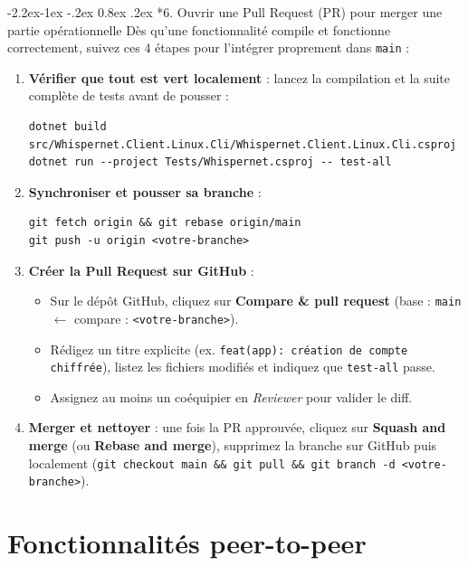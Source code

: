 \documentclass[11pt,a4paper]{article}
\makeatletter
\renewcommand\subsubsection{\@startsection{subsubsection}{3}{\z@}%
                                     {-2.2ex\@plus -1ex \@minus -.2ex}%
                                     {0.8ex \@plus .2ex}%
                                     {\normalfont\normalsize\bfseries\color{AccentTeal}}}
\makeatother
\begin{document}
\subsubsection*{6. Ouvrir une Pull Request (PR) pour merger une partie opérationnelle}
Dès qu'une fonctionnalité compile et fonctionne correctement, suivez ces 4 étapes pour l'intégrer proprement dans \texttt{main} :
\begin{enumerate}
    \item \textbf{Vérifier que tout est vert localement} : lancez la compilation et la suite complète de tests avant de pousser :
\begin{lstlisting}
dotnet build src/Whispernet.Client.Linux.Cli/Whispernet.Client.Linux.Cli.csproj
dotnet run --project Tests/Whispernet.csproj -- test-all
\end{lstlisting}
    \item \textbf{Synchroniser et pousser sa branche} :
\begin{lstlisting}
git fetch origin && git rebase origin/main
git push -u origin <votre-branche>
\end{lstlisting}
    \item \textbf{Créer la Pull Request sur GitHub} :
    \begin{itemize}
        \item Sur le dépôt GitHub, cliquez sur \textbf{Compare \& pull request} (base : \texttt{main} $\leftarrow$ compare : \texttt{<votre-branche>}).
        \item Rédigez un titre explicite (ex. \texttt{feat(app): création de compte chiffrée}), listez les fichiers modifiés et indiquez que \texttt{test-all} passe.
        \item Assignez au moins un coéquipier en \emph{Reviewer} pour valider le diff.
    \end{itemize}
    \item \textbf{Merger et nettoyer} : une fois la PR approuvée, cliquez sur \textbf{Squash and merge} (ou \textbf{Rebase and merge}), supprimez la branche sur GitHub puis localement (\texttt{git checkout main \&\& git pull \&\& git branch -d <votre-branche>}).
\end{enumerate}

\newpage

\section{Fonctionnalités peer-to-peer}

\end{document}
